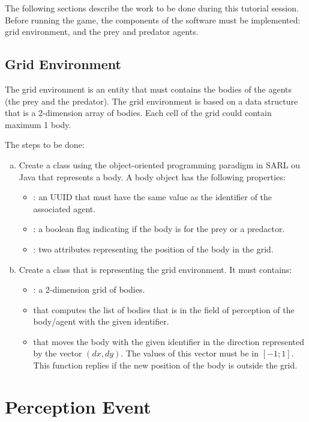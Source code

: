 \documentclass[english,nodocumentinfo,nopubpage]{utbmciadreport}
\begin{document}
The following sections describe the work to be done during this tutorial session. Before running the game, the components of the software must be implemented: grid environment, and the prey and predator agents.

\subsection{Grid Environment}

The grid environment is an entity that must contains the bodies of the agents (the prey and the predator). The grid environment is based on a data structure that is a 2-dimension array of bodies. Each cell of the grid could contain maximum 1 body.

The steps to be done:
\begin{enumerate}[a)]
\item Create a class  using the object-oriented programming paradigm in SARL ou Java that represents a body. A body object has the following properties:
	\begin{itemize}
		\item {} : an UUID that must have the same value as the identifier of the associated agent.
		\item {} : a boolean flag indicating if the body is for the prey or a predactor.
		\item {} : two attributes representing the position of the body in the grid.
	\end{itemize}
\item Create a class  that is representing the grid environment. It must contains:
	\begin{itemize}
	\item {} : a 2-dimension grid of bodies.
	\item {} that computes the list of bodies that is in the field of perception of the body/agent with the given identifier.
	\item {} that moves the body with the given identifier in the direction represented by the vector $(dx,dy)$. The values of this vector must be in $[-1;1]$. This function replies  if the new position of the body is outside the grid.
\end{itemize}
\end{enumerate}

\section{Perception Event}
\end{document}
